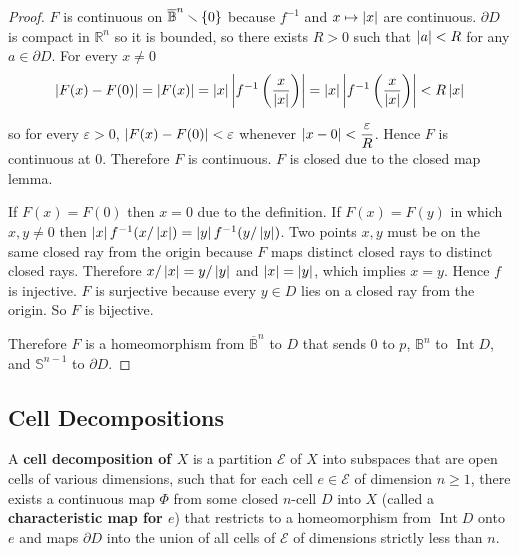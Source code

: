 \begin{proof}
	\( F \) is continuous on \( \overline{\mathbb{B}}^{n}\smallsetminus\left\{{0}\right\} \) because \( f^{-1} \) and \( x\mapsto \left\vert{x}\right\vert \) are continuous. \( \partial D \) is compact in \( \mathbb{R}^{n} \) so it is bounded, so there exists \( R > 0 \) such that \( \left\vert{a}\right\vert < R \) for any \( a \in \partial D \). For every \( x \ne 0 \)
	\begin{align*}
		\left\vert{F(x) - F(0)}\right\vert = \left\vert{F(x)}\right\vert = \left\vert{x}\right\vert\left\vert{f^{-1}\left(\frac{x}{\left\vert{x}\right\vert}\right)}\right\vert = \left\vert{x}\right\vert\left\vert{f^{-1}\left(\frac{x}{\left\vert{x}\right\vert}\right)}\right\vert < R\left\vert{x}\right\vert
	\end{align*}

	so for every \( \varepsilon > 0 \), \( \left\vert{F(x) - F(0)}\right\vert < \varepsilon \) whenever \( \left\vert{x - 0}\right\vert < \dfrac{\varepsilon}{R} \). Hence \( F \) is continuous at \( 0 \). Therefore \( F \) is continuous. \( F \) is closed due to the closed map lemma.

	If \( F(x) = F(0) \) then \( x = 0 \) due to the definition. If \( F(x) = F(y) \) in which \( x, y\ne 0 \) then \( \left\vert{x}\right\vert f^{-1}(x/\left\vert{x}\right\vert) = \left\vert{y}\right\vert f^{-1}(y/\left\vert{y}\right\vert) \). Two points \( x, y \) must be on the same closed ray from the origin because \( F \) maps distinct closed rays to distinct closed rays. Therefore \( x/\left\vert{x}\right\vert = y/\left\vert{y}\right\vert \) and \( \left\vert{x}\right\vert = \left\vert{y}\right\vert \), which implies \( x = y \). Hence \( f \) is injective. \( F \) is surjective because every \( y\in D \) lies on a closed ray from the origin. So \( F \) is bijective.

	Therefore \( F \) is a homeomorphism from \( \overline{\mathbb{B}}^{n} \) to \( D \) that sends \( 0 \) to \( p \), \( \mathbb{B}^{n} \) to \( \operatorname{Int} D \), and \( \mathbb{S}^{n-1} \) to \( \partial D \).
\end{proof}

\subsection{Cell Decompositions}

A \textbf{cell decomposition of \( X \)} is a partition \( \mathscr{E} \) of \( X \) into subspaces that are open cells of various dimensions, such that for each cell \( e \in \mathscr{E} \) of dimension \( n\geq 1 \), there exists a continuous map \( \Phi \) from some closed \( n \)-cell \( D \) into \( X \) (called a \textbf{characteristic map for \( e \)}) that restricts to a homeomorphism from \( \operatorname{Int} D \) onto \( e \) and maps \( \partial D \) into the union of all cells of \( \mathscr{E} \) of dimensions strictly less than \( n \).

